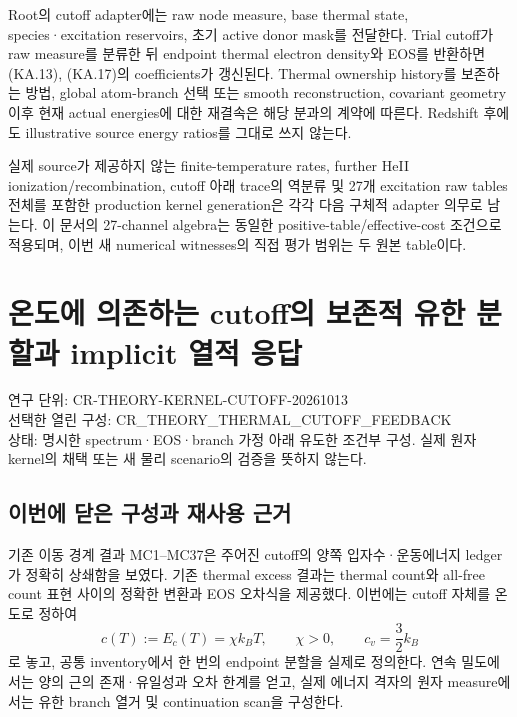 \documentclass[11pt,a4paper]{article}
\begin{document}
Root의 cutoff adapter에는 raw node measure, base thermal state, species·excitation reservoirs, 초기 active donor mask를 전달한다. Trial cutoff가 raw measure를 분류한 뒤 endpoint thermal electron density와 EOS를 반환하면 (KA.13), (KA.17)의 coefficients가 갱신된다. Thermal ownership history를 보존하는 방법, global atom-branch 선택 또는 smooth reconstruction, covariant geometry 이후 현재 actual energies에 대한 재결속은 해당 분과의 계약에 따른다. Redshift 후에도 illustrative source energy ratios를 그대로 쓰지 않는다.

실제 source가 제공하지 않는 finite-temperature rates, further HeII ionization/recombination, cutoff 아래 trace의 역분류 및 27개 excitation raw tables 전체를 포함한 production kernel generation은 각각 다음 구체적 adapter 의무로 남는다. 이 문서의 27-channel algebra는 동일한 positive-table/effective-cost 조건으로 적용되며, 이번 새 numerical witnesses의 직접 평가 범위는 두 원본 table이다.

\hypertarget{uxc628uxb3c4uxc5d0-uxc758uxc874uxd558uxb294-cutoffuxc758-uxbcf4uxc874uxc801-uxc720uxd55c-uxbd84uxd560uxacfc-implicit-uxc5f4uxc801-uxc751uxb2f5}{%
\section{온도에 의존하는 cutoff의 보존적 유한 분할과 implicit 열적 응답}\label{uxc628uxb3c4uxc5d0-uxc758uxc874uxd558uxb294-cutoffuxc758-uxbcf4uxc874uxc801-uxc720uxd55c-uxbd84uxd560uxacfc-implicit-uxc5f4uxc801-uxc751uxb2f5}}

연구 단위: CR-THEORY-KERNEL-CUTOFF-20261013\\
선택한 열린 구성: CR\_THEORY\_THERMAL\_CUTOFF\_FEEDBACK\\
상태: 명시한 spectrum·EOS·branch 가정 아래 유도한 조건부 구성. 실제 원자 kernel의 채택 또는 새 물리 scenario의 검증을 뜻하지 않는다.

\hypertarget{uxc774uxbc88uxc5d0-uxb2ebuxc740-uxad6cuxc131uxacfc-uxc7acuxc0acuxc6a9-uxadfcuxac70}{%
\subsection{이번에 닫은 구성과 재사용 근거}\label{uxc774uxbc88uxc5d0-uxb2ebuxc740-uxad6cuxc131uxacfc-uxc7acuxc0acuxc6a9-uxadfcuxac70}}

기존 이동 경계 결과 MC1--MC37은 주어진 cutoff의 양쪽 입자수·운동에너지 ledger가 정확히 상쇄함을 보였다. 기존 thermal excess 결과는 thermal count와 all-free count 표현 사이의 정확한 변환과 EOS 오차식을 제공했다. 이번에는 cutoff 자체를 온도로 정하여 \[
c(T):=E_c(T)=\chi k_BT,\qquad \chi>0,\qquad c_v=\frac32k_B
\tag{TCF.1}
\] 로 놓고, 공통 inventory에서 한 번의 endpoint 분할을 실제로 정의한다. 연속 밀도에서는 양의 근의 존재·유일성과 오차 한계를 얻고, 실제 에너지 격자의 원자 measure에서는 유한 branch 열거 및 continuation scan을 구성한다.
\end{document}

